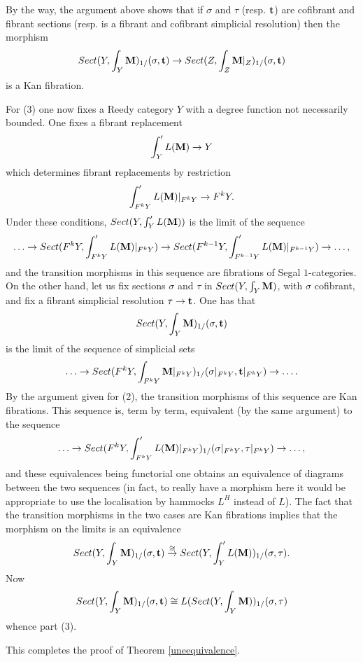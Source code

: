 By the way, the argument above shows that if $\sigma$ and $\tau$ (resp. ${\bf
t}$) are cofibrant and fibrant sections (resp.
is a fibrant
and cofibrant simplicial
resolution) then the morphism
$$
Sect (Y, \int _Y{\bf M} )_{1/}(\sigma , {\bf t} )\rightarrow
Sect (Z, \int _Z{\bf M} |_Z)_{1/}(\sigma , {\bf t} )
$$
is a Kan fibration.

For (3) one now fixes a Reedy category $Y$ with a degree
function not necessarily bounded. One fixes a fibrant replacement
$$
\int '_YL({\bf M} )\rightarrow Y
$$
which determines fibrant replacements by restriction
$$
\int '_{F^kY} L({\bf M} )|_{F^kY}\rightarrow F^kY.
$$
Under these conditions, $Sect (Y, \int '_YL({\bf M} ))$ is the limit of the
sequence
$$
\ldots \rightarrow Sect (F^kY, \int '_{F^kY}L({\bf M} )|_{F^kY})
\rightarrow Sect (F^{k-1}Y, \int '_{F^{k-1}Y}L({\bf M}
)|_{F^{k-1}Y})\rightarrow \ldots ,
$$
and the transition morphisms in this sequence are fibrations
of Segal $1$-categories. On the other hand, let us fix sections $\sigma$ and
$\tau$ in $Sect (Y, \int _Y{\bf M} )$, with $\sigma$ cofibrant, and fix a
fibrant simplicial resolution $\tau \rightarrow {\bf t}$. One has that
$$
Sect (Y, \int _Y{\bf M} )_{1/}(\sigma , {\bf t})
$$
is the limit of the sequence of simplicial sets
$$
\ldots \rightarrow Sect (F^kY, \int _{F^kY}{\bf M} |_{F^kY})_{1/}(\sigma
|_{F^kY}, {\bf t}|_{F^kY})
\rightarrow \ldots .
$$
By the argument given for (2), the transition morphisms
of this sequence are
Kan fibrations. This sequence is, term by term, equivalent
(by the same argument) to the sequence
$$
\ldots \rightarrow Sect (F^kY, \int '_{F^kY}L({\bf M} )|_{F^kY})_{1/}(\sigma
|_{F^kY}, \tau |_{F^kY}
) \rightarrow \ldots ,
$$
and these equivalences being functorial one obtains an equivalence
of diagrams between the two sequences (in fact, to really have a morphism
here it would be appropriate to use the localisation by hammocks $L^H$
instead of $L$). The
fact that the transition morphisms in the two cases are Kan
fibrations implies that the morphism on the limits is an equivalence
$$
Sect (Y, \int _Y{\bf M} )_{1/}(\sigma , {\bf t})\stackrel{\cong}{\rightarrow}
Sect (Y, \int '_YL({\bf M} ))_{1/}(\sigma , \tau ).
$$
Now
$$
Sect (Y, \int _Y{\bf M} )_{1/}(\sigma , {\bf t}) \cong
L(Sect (Y, \int _Y{\bf M} ))_{1/}(\sigma , \tau )
$$
whence part (3).

This completes the proof of Theorem \ref{uneequivalence}.
\eop
